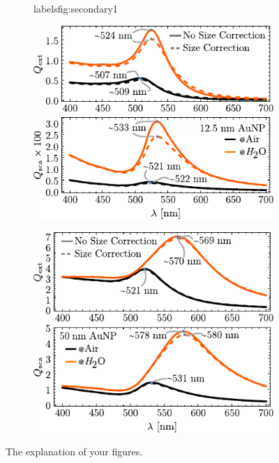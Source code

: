 %
\begin{figure}[h!]\centering
	\begin{subfigure}{.05\textwidth}\caption{}\label{•}label{sfig:secondary1}\vspace*{5.5cm}\end{subfigure}
	\hspace*{-2.em}
	\begin{subfigure}{.48\textwidth} \includegraphics[scale = 1.02]{1-Theory/figs/QextQsca_12-5.pdf}\end{subfigure}
	\hspace*{-.5em}\begin{subfigure}{.05\textwidth}\vspace{-5.5cm}\caption{}\label{sfig:secondaty2}	\end{subfigure}
	\hspace*{-2.em}
	\begin{subfigure}{.48\textwidth} \includegraphics[scale = 1.02]{1-Theory/figs/QextQsca_50.pdf}\end{subfigure}%
\vspace*{-.5em}
\caption[Example of Figure title]{The explanation of your figures. \blindtext}	\label{fig:Main}
\end{figure}

